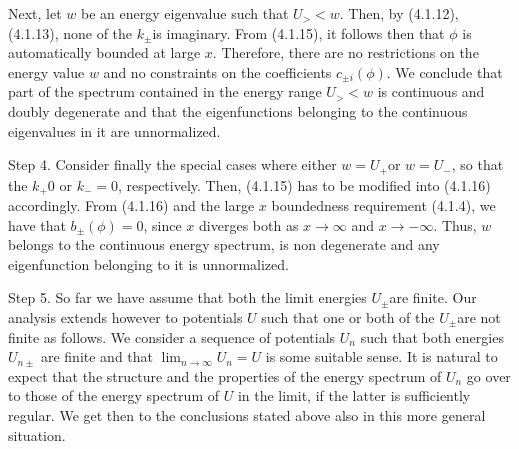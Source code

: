 \documentclass{article}
\begin{document}
Next, let $w$ be an energy eigenvalue such that $U_{>}<w$. Then, by (4.1.12), (4.1.13), none of the $k_{ \pm}$is imaginary. From (4.1.15), it follows then that $\phi$ is automatically bounded at large $x$. Therefore, there are no restrictions on the energy value $w$ and no constraints on the coefficients $c_{ \pm i}(\phi)$. We conclude that part of the spectrum contained in the energy range $U_{>}<w$ is continuous and doubly degenerate and that the eigenfunctions belonging to the continuous eigenvalues in it are unnormalized.

Step 4. Consider finally the special cases where either $w=U_{+}$or $w=U_{-}$, so that the $k_{+} 0$ or $k_{-}=0$, respectively. Then, (4.1.15) has to be modified into (4.1.16) accordingly. From (4.1.16) and the large $x$ boundedness requirement (4.1.4), we have that $b_{ \pm}(\phi)=0$, since $x$ diverges both as $x \rightarrow \infty$ and $x \rightarrow-\infty$. Thus, $w$ belongs to the continuous energy spectrum, is non degenerate and any eigenfunction belonging to it is unnormalized.

Step 5. So far we have assume that both the limit energies $U_{ \pm}$are finite. Our analysis extends however to potentials $U$ such that one or both of the $U_{ \pm}$are not finite
as follows. We consider a sequence of potentials $U_{n}$ such that both energies $U_{n \pm}$ are finite and that $\lim _{n \rightarrow \infty} U_{n}=U$ is some suitable sense. It is natural to expect that the structure and the properties of the energy spectrum of $U_{n}$ go over to those of the energy spectrum of $U$ in the limit, if the latter is sufficiently regular. We get then to the conclusions stated above also in this more general situation.
\end{document}
